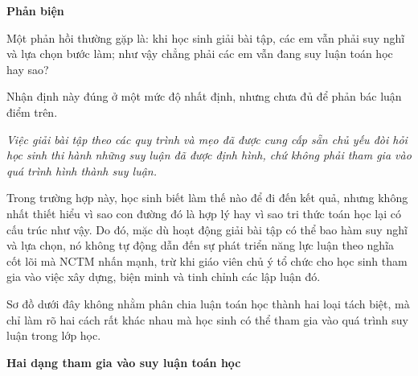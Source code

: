 \documentclass[
  10pt,
  a4paper,
  landscape,
  twoside,
  openany
]{scrbook}
\begin{document}
{{\vspace{.3\baselineskip}
\noindent
\textbf{Phản biện}

Một phản hồi thường gặp là: khi học sinh giải bài tập, các em vẫn phải suy nghĩ và lựa chọn bước làm; như vậy chẳng phải các em vẫn đang suy luận toán học hay sao? 

Nhận định này đúng ở một mức độ nhất định, nhưng chưa đủ để phản bác luận điểm trên. 

\emph{Việc giải bài tập theo các quy trình và mẹo đã được cung cấp sẵn chủ yếu đòi hỏi học sinh thi hành những suy luận đã được định hình, chứ không phải tham gia vào quá trình hình thành suy luận.}

Trong trường hợp này, học sinh biết làm thế nào để đi đến kết quả, nhưng không nhất thiết hiểu vì sao con đường đó là hợp lý hay vì sao tri thức toán học lại có cấu trúc như vậy. Do đó, mặc dù hoạt động giải bài tập có thể bao hàm suy nghĩ và lựa chọn, nó không tự động dẫn đến sự phát triển năng lực luận theo nghĩa cốt lõi mà NCTM nhấn mạnh, trừ khi giáo viên chủ ý tổ chức cho học sinh tham gia vào việc xây dựng, biện minh và tinh chỉnh các lập luận đó.

Sơ đồ dưới đây không nhằm phân chia luận toán học thành hai loại tách biệt, mà chỉ làm rõ hai cách rất khác nhau mà học sinh có thể tham gia vào quá trình suy luận trong lớp học.

\vspace{.3\baselineskip}
\noindent
\textbf{Hai dạng tham gia vào suy luận toán học}

}}
\end{document}

